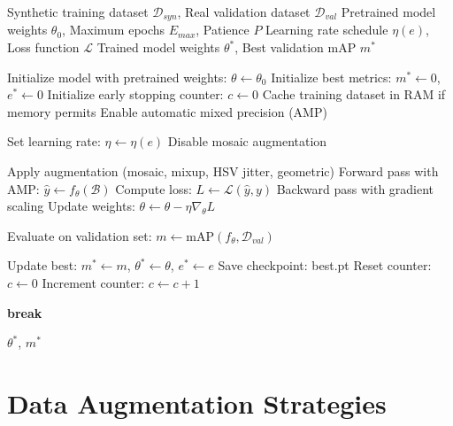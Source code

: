 \begin{algorithm}[htbp]
\caption{YOLO Training Loop with Early Stopping for RL Integration}
\label{alg:training_loop}
\begin{algorithmic}[1]
\Require Synthetic training dataset $\mathcal{D}_{syn}$, Real validation dataset $\mathcal{D}_{val}$
\Require Pretrained model weights $\theta_0$, Maximum epochs $E_{max}$, Patience $P$
\Require Learning rate schedule $\eta(e)$, Loss function $\mathcal{L}$
\Ensure Trained model weights $\theta^*$, Best validation mAP $m^*$

\State Initialize model with pretrained weights: $\theta \leftarrow \theta_0$
\State Initialize best metrics: $m^* \leftarrow 0$, $e^* \leftarrow 0$
\State Initialize early stopping counter: $c \leftarrow 0$
\State Cache training dataset in RAM if memory permits
\State Enable automatic mixed precision (AMP)

    \State Set learning rate: $\eta \leftarrow \eta(e)$
        \State Disable mosaic augmentation 
    \EndIf

        \State Apply augmentation (mosaic, mixup, HSV jitter, geometric)
        \State Forward pass with AMP: $\hat{y} \leftarrow f_\theta(\mathcal{B})$
        \State Compute loss: $L \leftarrow \mathcal{L}(\hat{y}, y)$ 
        \State Backward pass with gradient scaling
        \State Update weights: $\theta \leftarrow \theta - \eta \nabla_\theta L$
    \EndFor

    \State Evaluate on validation set: $m \leftarrow \text{mAP}(f_\theta, \mathcal{D}_{val})$

        \State Update best: $m^* \leftarrow m$, $\theta^* \leftarrow \theta$, $e^* \leftarrow e$
        \State Save checkpoint: best.pt
        \State Reset counter: $c \leftarrow 0$
    \Else
        \State Increment counter: $c \leftarrow c + 1$
    \EndIf

        \State \textbf{break} 
    \EndIf
\EndFor

\State \Return $\theta^*$, $m^*$
\end{algorithmic}
\end{algorithm}

\section{Data Augmentation Strategies}
\label{sec:augmentation}

